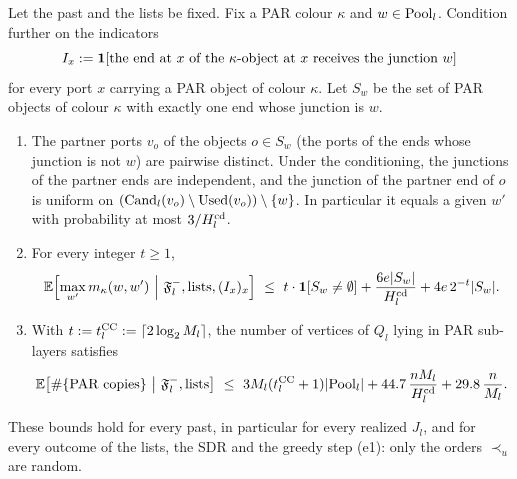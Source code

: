 \begin{lemma}\label{s7:lemCC}
Let the past and the lists be fixed. Fix a PAR colour $\kappa$ and $w\in\mathrm{Pool}_l$.
Condition further on the indicators
\[
I_x\mathrel{:=}\mathbf{1}[\text{the end at $x$ of the $\kappa$-object at $x$ receives the junction }w]
\]
for every port $x$ carrying a PAR object of colour $\kappa$. Let $S_w$ be the
set of PAR objects of colour $\kappa$ with exactly one end whose junction is $w$.
\begin{enumerate}
\item[(i)] The partner ports $v_o$ of the objects $o\in S_w$ (the ports of the
ends whose junction is not $w$) are pairwise distinct. Under the conditioning,
the junctions of the partner ends are independent, and the junction of the
partner end of $o$ is uniform on $(\mathrm{Cand}_l(v_o)\setminus\mathrm{Used}(v_o))\setminus\{w\}$.
In particular it equals a given $w'$ with probability at most $3/H^{\mathrm{cd}}_l$.
\item[(ii)] For every integer $t\ge1$,
\[
\Ex\Bigl[\max_{w'}m_\kappa(w,w')\ \Big|\ \Past_l,\text{lists},(I_x)_x\Bigr]
\ \le\ t\cdot\ind{S_w\ne\emptyset}+\frac{6e|S_w|}{\Hcd_l}+4e\,2^{-t}|S_w| .
\]
\item[(iii)] With $t\mathrel{:=}t^{\mathrm{CC}}_l\mathrel{:=}\lceil2\log_2M_l\rceil$, the number of
vertices of $Q_l$ lying in PAR sub-layers satisfies
\[
\Ex\bigl[\#\{\text{PAR copies}\}\ \big|\ \Past_l,\text{lists}\bigr]\ \le\
3M_l(\tCC_l+1)|\Pool_l|+44.7\,\frac{nM_l}{\Hcd_l}+29.8\,\frac{n}{M_l}.
\]
\end{enumerate}
These bounds hold for every past, in particular for every realized $J_l$, and for
every outcome of the lists, the SDR and the greedy step (e1): only the orders
$\prec_u$ are random.
\deps{\ref{s7:consRound}, \ref{s7:lemWellDef}, \ref{s1:citChernoffGen}, \ref{s6:lemJplus}}
\end{lemma}

